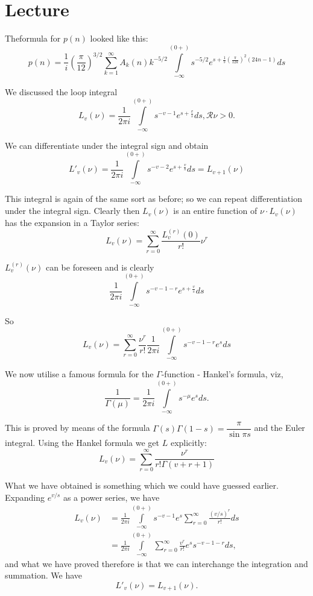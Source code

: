 \chapter{Lecture}\label{part3:lec19} %

The\pageoriginale formula for $p(n)$ looked like this:
$$
p(n) = \frac{1}{i} \left( \frac{\pi}{12}\right)^{3/2}
\sum^\infty_{k=1} A_k (n) k^{- 5/2} \int\limits^{(0+)}_{- \infty}
s^{- 5/2} e^{s+ \frac{1}{s} (\frac{\pi}{12k})^2 (24n-1)} ds
$$

We discussed the loop integral
$$
L_v (\nu) = \frac{1}{2 \pi i} \int\limits^{(0+)}_{ -\infty} s^{-v -1}
e^{s + \frac{v}{s}}ds, \mathscr{R} \nu > 0.
$$

We can differentiate under the integral sign and obtain
$$
L'_v (\nu) = \frac{1}{2 \pi i}\int\limits^{(0+)}_{ -\infty} s^{-v -2}
e^{s + \frac{v}{s}}ds= L_{v+1} (\nu)
$$

This integral is again of the same sort as before; so we can repeat
differentiation under the integral sign. Clearly then $L_v (\nu)$ is
an entire function of $\nu \cdot L_v (\nu)$ has the expansion in a
Taylor series:
$$
L_v (\nu) = \sum^\infty_{r=0} \frac{L_v^{(r)} (0)}{r!} \nu^r
$$

$L_v^{(r)} (\nu)$ can be foreseen and is clearly
$$
\frac{1}{2 \pi i} \int\limits^{(0+)}_{- \infty} s^{-v -1-r} e^{s +
  \frac{v}{s}} ds
$$

So\pageoriginale  
$$
L_v (\nu) = \sum^\infty_{r=0} \frac{\nu^r}{r!} \frac{1}{2 \pi i}
\int\limits^{(0+)}_{- \infty} s^{-v -1-r} e^s ds
$$

We now utilise a famous formula for the $\Gamma$-function - Hankel's
formula, viz,
$$
\frac{1}{\Gamma (\mu)} = \frac{1}{2 \pi i} \int\limits^{(0+)}_{-
  \infty} s^{- \mu} e^{s} ds.
$$

This is proved by means of the formula $\Gamma (s) \Gamma (1-s)=
\dfrac{\pi}{\sin \pi s}$ and the Euler integral. Using the Hankel
formula we get $L$ explicitly:
$$
L_v (\nu) = \sum^\infty_{r=0} \frac{\nu^r}{r! \Gamma (v +r+1)}
$$

What we have obtained is something which we could have guessed
earlier. Expanding $e^{v/s}$ as a power series, we have
\begin{align*}
  L_v (\nu) & = \frac{1}{2 \pi i} \int\limits^{(0+)}_{- \infty} s^{-
    v-1} e^s \sum^\infty_{r=0} \frac{(v/s)^r}{r!} ds\\
  & = \frac{1}{2 \pi i} \int\limits^{(0+)}_{-\infty}
  \sum^\infty_{r=0} \frac{v^r}{r!} e^s s^{-v-1-r} ds,
\end{align*}
and what we have proved therefore is that we can interchange the
integration and summation. We have
$$
L'_v (\nu) = L_{v+1} (\nu).
$$

